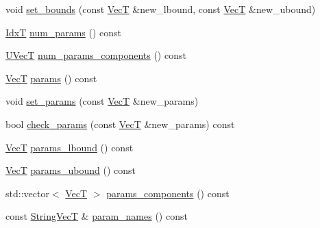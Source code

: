 \begin{DoxyCompactItemize}
\item 
void \hyperlink{classprior__hessian_1_1CompositeDist_ae7a0e0a30b13823413dd1b4bea4163ca}{set\+\_\+bounds} (const \hyperlink{namespaceprior__hessian_a0b42fc70dec525d83fb2ac155d9ab974}{VecT} \&new\+\_\+lbound, const \hyperlink{namespaceprior__hessian_a0b42fc70dec525d83fb2ac155d9ab974}{VecT} \&new\+\_\+ubound)
\item 
\hyperlink{namespaceprior__hessian_aa8d589f74e88bfa3b5750118acd1ab78}{IdxT} \hyperlink{classprior__hessian_1_1CompositeDist_ae7742f32d7e64ca2c7b55132a8ae6895}{num\+\_\+params} () const 
\item 
\hyperlink{namespaceprior__hessian_a1dddd04f1dc39e5790229a485728a48f}{U\+VecT} \hyperlink{classprior__hessian_1_1CompositeDist_a389c0e5459eeacc5f35afdf14d6a38d7}{num\+\_\+params\+\_\+components} () const 
\item 
\hyperlink{namespaceprior__hessian_a0b42fc70dec525d83fb2ac155d9ab974}{VecT} \hyperlink{classprior__hessian_1_1CompositeDist_adc8761a6b3dda7ffe7d1694cebcd21f5}{params} () const 
\item 
void \hyperlink{classprior__hessian_1_1CompositeDist_a8f0b1c79d0d4319adf783fe4fdbf7eb0}{set\+\_\+params} (const \hyperlink{namespaceprior__hessian_a0b42fc70dec525d83fb2ac155d9ab974}{VecT} \&new\+\_\+params)
\item 
bool \hyperlink{classprior__hessian_1_1CompositeDist_aad146947bd3ba5620cf30e5d98a98d6c}{check\+\_\+params} (const \hyperlink{namespaceprior__hessian_a0b42fc70dec525d83fb2ac155d9ab974}{VecT} \&new\+\_\+params) const 
\item 
\hyperlink{namespaceprior__hessian_a0b42fc70dec525d83fb2ac155d9ab974}{VecT} \hyperlink{classprior__hessian_1_1CompositeDist_a3520120621a69469e885ba64f08ede3a}{params\+\_\+lbound} () const 
\item 
\hyperlink{namespaceprior__hessian_a0b42fc70dec525d83fb2ac155d9ab974}{VecT} \hyperlink{classprior__hessian_1_1CompositeDist_ab9eac2d70f484d2d0d4ead6a21d6f798}{params\+\_\+ubound} () const 
\item 
std\+::vector$<$ \hyperlink{namespaceprior__hessian_a0b42fc70dec525d83fb2ac155d9ab974}{VecT} $>$ \hyperlink{classprior__hessian_1_1CompositeDist_a927fed39b2b4e87714c728d6e7b11e8b}{params\+\_\+components} () const 
\item 
const \hyperlink{namespaceprior__hessian_a61fc0176249462ee94fe3cca92cf3f8c}{String\+VecT} \& \hyperlink{classprior__hessian_1_1CompositeDist_ae7ca30fd19fb59ebe241873443b9faed}{param\+\_\+names} () const 
\item 

\end{DoxyCompactItemize}
